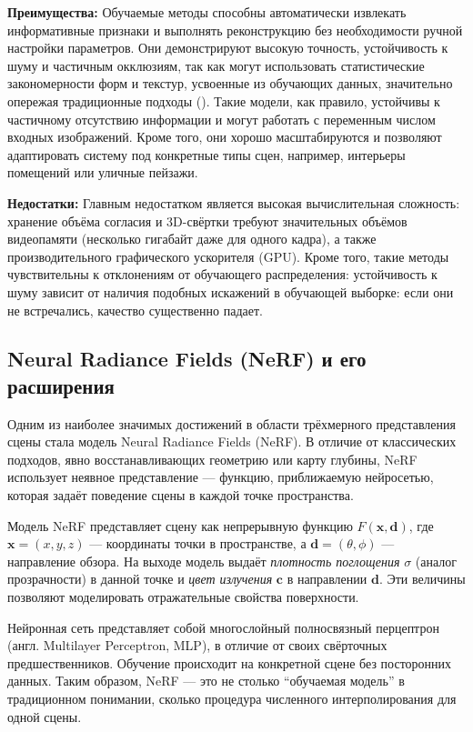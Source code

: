 \textbf{Преимущества:}
Обучаемые методы способны автоматически извлекать информативные признаки и
выполнять реконструкцию без необходимости ручной настройки параметров. Они
демонстрируют высокую точность, устойчивость к шуму и частичным окклюзиям, так
как могут использовать статистические закономерности форм и текстур, усвоенные
из обучающих данных, значительно опережая традиционные подходы
(\cite{10.1109/CVPR.2017.272}). Такие модели, как правило, устойчивы к
частичному отсутствию информации и могут работать с переменным числом входных
изображений. Кроме того, они хорошо масштабируются и позволяют адаптировать
систему под конкретные типы сцен, например, интерьеры помещений или уличные
пейзажи.

\textbf{Недостатки:}
Главным недостатком является высокая вычислительная сложность: хранение объёма
согласия и 3D-свёртки требуют значительных объёмов видеопамяти (несколько
гигабайт даже для одного кадра), а также производительного графического
ускорителя (GPU). Кроме того, такие методы чувствительны к отклонениям от
обучающего распределения: устойчивость к шуму зависит от наличия подобных
искажений в обучающей выборке: если они не встречались, качество существенно
падает.

\subsection{Neural Radiance Fields (NeRF) и его расширения}

Одним из наиболее значимых достижений в области трёхмерного представления сцены
стала модель Neural Radiance Fields (NeRF). В отличие от классических подходов,
явно восстанавливающих геометрию или карту глубины, NeRF использует
неявное представление — функцию, приближаемую нейросетью, которая
задаёт поведение сцены в каждой точке пространства.

Модель NeRF представляет сцену как непрерывную функцию $F(\mathbf{x},
\mathbf{d})$, где $\mathbf{x} = (x, y, z)$ — координаты точки в пространстве, а
$\mathbf{d}=(\theta,\phi)$ — направление обзора. На выходе модель выдаёт
\textit{плотность поглощения} $\sigma$ (аналог прозрачности) в данной точке и
\textit{цвет излучения} $\mathbf{c}$ в направлении $\mathbf{d}$. Эти величины
позволяют моделировать отражательные свойства поверхности.

Нейронная сеть представляет собой  многослойный полносвязный перцептрон (англ.
Multilayer Perceptron, MLP), в отличие от своих свёрточных предшественников.
Обучение происходит на конкретной сцене без посторонних данных. Таким образом,
NeRF — это не столько ``обучаемая модель'' в традиционном понимании, сколько
процедура численного интерполирования для одной сцены.

